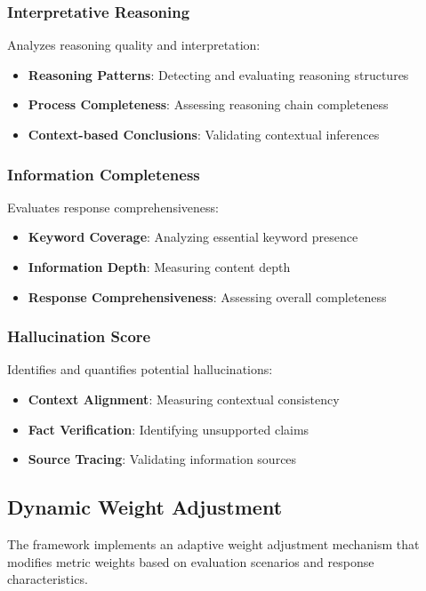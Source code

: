 \subsubsection{Interpretative Reasoning}
Analyzes reasoning quality and interpretation:
\begin{itemize}
    \item \textbf{Reasoning Patterns}: Detecting and evaluating reasoning structures
    \item \textbf{Process Completeness}: Assessing reasoning chain completeness
    \item \textbf{Context-based Conclusions}: Validating contextual inferences
\end{itemize}

\subsubsection{Information Completeness}
Evaluates response comprehensiveness:
\begin{itemize}
    \item \textbf{Keyword Coverage}: Analyzing essential keyword presence
    \item \textbf{Information Depth}: Measuring content depth
    \item \textbf{Response Comprehensiveness}: Assessing overall completeness
\end{itemize}

\subsubsection{Hallucination Score}
Identifies and quantifies potential hallucinations:
\begin{itemize}
    \item \textbf{Context Alignment}: Measuring contextual consistency
    \item \textbf{Fact Verification}: Identifying unsupported claims
    \item \textbf{Source Tracing}: Validating information sources
\end{itemize}

\subsection{Dynamic Weight Adjustment}
The framework implements an adaptive weight adjustment mechanism that modifies metric weights based on evaluation scenarios and response characteristics.

